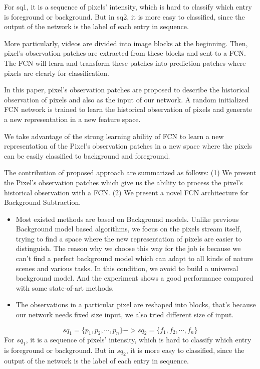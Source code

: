 \documentclass[journal]{IEEEtran}
\begin{document}

For sq1, it is a sequence of pixels' intensity, which is hard to classify which entry is foreground or background.
But in sq2, it is more easy to classified, since the output of the network is the label of each entry in sequence.

More particularly, videos are divided into image blocks at the beginning. Then, pixel's observation patches are extracted from these blocks and sent to a FCN.
The FCN will learn and transform these patches into prediction patches where pixels are clearly for classification.

In this paper, pixel’s observation patches are proposed to describe the historical observation of pixels and also as the input of our network. 
A random initialized FCN network is trained to learn the historical observation of pixels and generate a new representation in a new feature space.

We take advantage of the strong learning ability of FCN to learn a new representation of the Pixel’s observation patches in a new space where 
the pixels can be easily classified to background and foreground. 

The contribution of proposed approach are summarized as follows:
(1) We present the Pixel's observation patches which give us the ability to process the pixel's historical observation with a FCN.
(2) We present a novel FCN architecture for Background Subtraction.
 
\begin{itemize}
    \item    
        Most existed methods are based on Background models. 
        Unlike previous Background model based algorithms, we focus on the pixels stream itself, trying to find a space where the new representation
        of pixels are easier to distinguish. 
        The reason why we choose this way for the job is because we can't find a perfect background model which can adapt to all kinds of nature 
        scenes and various tasks. In this condition, we avoid to build a universal background model. And the experiment shows a good performance 
        compared with some state-of-art methods.

    \item The observations in a particular pixel are reshaped into blocks, that's because our network needs fixed size input, we also tried different 
        size of input.
\end{itemize}
\begin{equation}
    sq_1 = \{p_1,p_2,\cdots, p_n\} -> sq_2 = \{f_1, f_2, \cdots, f_n\}
\end{equation}
For $sq_1$, it is a sequence of pixels' intensity, which is hard to classify which entry is foreground or background.
%
But in $sq_2$, it is more easy to classified, since the output of the network is the label of each entry in sequence.
\end{document}
